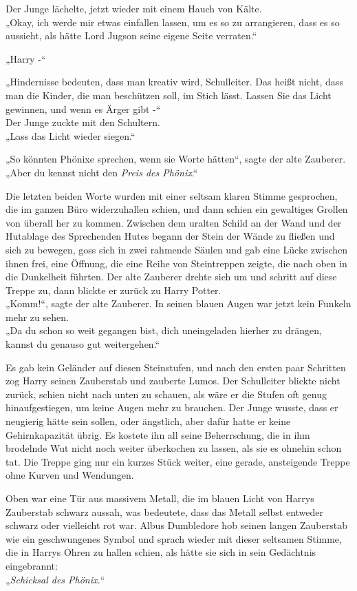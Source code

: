{Der Junge lächelte, jetzt wieder mit einem Hauch von Kälte.\\ „Okay, ich werde mir etwas einfallen lassen, um es so zu arrangieren, dass es so aussieht, als hätte Lord Jugson seine eigene Seite verraten.“

„Harry -“

„Hindernisse bedeuten, dass man kreativ wird, Schulleiter. Das heißt nicht, dass man die Kinder, die man beschützen soll, im Stich lässt. Lassen Sie das Licht gewinnen, und wenn es Ärger gibt -“\\ Der Junge zuckte mit den Schultern.\\ „Lass das Licht wieder siegen.“

„So könnten Phönixe sprechen, wenn sie Worte hätten“, sagte der alte Zauberer. „Aber du kennst nicht den \emph{Preis des Phönix}.“

Die letzten beiden Worte wurden mit einer seltsam klaren Stimme gesprochen, die im ganzen Büro widerzuhallen schien, und dann schien ein gewaltiges Grollen von überall her zu kommen. Zwischen dem uralten Schild an der Wand und der Hutablage des Sprechenden Hutes begann der Stein der Wände zu fließen und sich zu bewegen, goss sich in zwei rahmende Säulen und gab eine Lücke zwischen ihnen frei, eine Öffnung, die eine Reihe von Steintreppen zeigte, die nach oben in die Dunkelheit führten. Der alte Zauberer drehte sich um und schritt auf diese Treppe zu, dann blickte er zurück zu Harry Potter.\\ „Komm!“, sagte der alte Zauberer. In seinen blauen Augen war jetzt kein Funkeln mehr zu sehen.\\ „Da du schon so weit gegangen bist, dich uneingeladen hierher zu drängen, kannst du genauso gut weitergehen.“

Es gab kein Geländer auf diesen Steinstufen, und nach den ersten paar Schritten zog Harry seinen Zauberstab und zauberte Lumos. Der Schulleiter blickte nicht zurück, schien nicht nach unten zu schauen, als wäre er die Stufen oft genug hinaufgestiegen, um keine Augen mehr zu brauchen. Der Junge wusste, dass er neugierig hätte sein sollen, oder ängstlich, aber dafür hatte er keine Gehirnkapazität übrig. Es kostete ihn all seine Beherrschung, die in ihm brodelnde Wut nicht noch weiter überkochen zu lassen, als sie es ohnehin schon tat. Die Treppe ging nur ein kurzes Stück weiter, eine gerade, ansteigende Treppe ohne Kurven und Wendungen.

Oben war eine Tür aus massivem Metall, die im blauen Licht von Harrys Zauberstab schwarz aussah, was bedeutete, dass das Metall selbst entweder schwarz oder vielleicht rot war. Albus Dumbledore hob seinen langen Zauberstab wie ein geschwungenes Symbol und sprach wieder mit dieser seltsamen Stimme, die in Harrys Ohren zu hallen schien, als hätte sie sich in sein Gedächtnis eingebrannt:\\ „\emph{Schicksal des Phönix.}“

}
